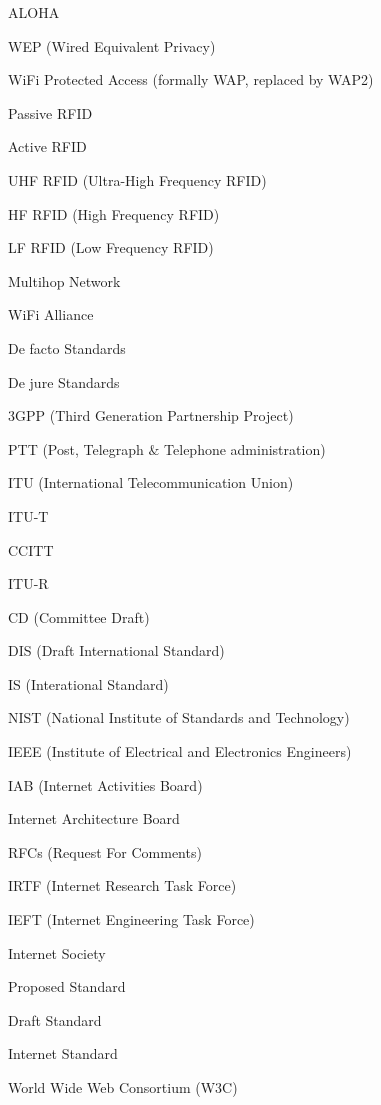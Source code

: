 \filbreak
\vskip 3mm
ALOHA

\filbreak
\vskip 3mm
WEP (Wired Equivalent Privacy)

\filbreak
\vskip 3mm
WiFi Protected Access (formally WAP, replaced by WAP2)

\filbreak
\vskip 3mm
Passive RFID

\filbreak
\vskip 3mm
Active RFID

\filbreak
\vskip 3mm
UHF RFID (Ultra-High Frequency RFID)

\filbreak
\vskip 3mm
HF RFID (High Frequency RFID)

\filbreak
\vskip 3mm
LF RFID (Low Frequency RFID)

\filbreak
\vskip 3mm
Multihop Network

\filbreak
\vskip 3mm
WiFi Alliance

\filbreak
\vskip 3mm
De facto Standards

\filbreak
\vskip 3mm
De jure Standards

\filbreak
\vskip 3mm
3GPP (Third Generation Partnership Project)

\filbreak
\vskip 3mm
PTT (Post, Telegraph $\&$ Telephone administration)

\filbreak
\vskip 3mm
ITU (International Telecommunication Union)

\filbreak
\vskip 3mm
ITU-T

\filbreak
\vskip 3mm
CCITT

\filbreak
\vskip 3mm
ITU-R

\filbreak
\vskip 3mm
CD (Committee Draft)

\filbreak
\vskip 3mm
DIS (Draft International Standard)

\filbreak
\vskip 3mm
IS (Interational Standard)

\filbreak
\vskip 3mm
NIST (National Institute of Standards and Technology)

\filbreak
\vskip 3mm
IEEE (Institute of Electrical and Electronics Engineers)

\filbreak
\vskip 3mm
IAB (Internet Activities Board)

\filbreak
\vskip 3mm
Internet Architecture Board

\filbreak
\vskip 3mm
RFCs (Request For Comments)

\filbreak
\vskip 3mm
IRTF (Internet Research Task Force)

\filbreak
\vskip 3mm
IEFT (Internet Engineering Task Force)

\filbreak
\vskip 3mm
Internet Society

\filbreak
\vskip 3mm
Proposed Standard

\filbreak
\vskip 3mm
Draft Standard

\filbreak
\vskip 3mm
Internet Standard

\filbreak
\vskip 3mm
World Wide Web Consortium (W3C)

\vfill\eject
\bye
